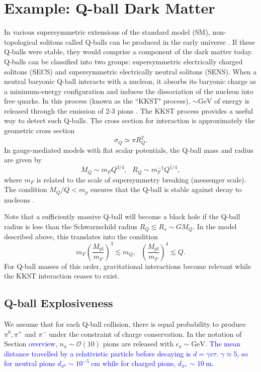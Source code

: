 \documentclass[twocolumn,showpacs,preprintnumbers,amsmath,amssymb,prd]{revtex4}
\newcommand{\OO}{\mathcal{O}}
\newcommand{\Mpl}{M_{\text{pl}}}
\def\r{\right)}
\def\l{\left(}
\begin{document}
\section{Example: Q-ball Dark Matter}
In various supersymmetric extensions of the standard model (SM), non-topological solitons called Q-balls can be produced in the early universe \cite{Coleman:1985ki, Kusenko:1997si}. If these Q-balls were stable, they would comprise a component of the dark matter today. Q-balls can be classified into two groups: supersymmetric electrically charged solitons (SECS) and supersymmetric electrically neutral solitons (SENS). When a neutral baryonic Q-ball interacts with a nucleon, it absorbs its baryonic charge as a minimum-energy configuration and induces the dissociation of the nucleon into free quarks. In this process (known as the ``KKST" process), $\sim \text{GeV}$ of energy is released through the emission of 2-3 pions \cite{Dine:2003ax}. The KKST process provides a useful way to detect such Q-balls. The cross section for interaction is approximately the geometric cross section
\begin{equation}
\sigma_Q \simeq \pi R_Q^2.
\end{equation}
In gauge-mediated models with flat scalar potentials, the Q-ball mass and radius are given by
\begin{equation}
M_Q \sim m_F Q^{3/4}, ~~~ R_Q \sim m_F^{-1} Q^{1/4},
\end{equation}
where $m_F$ is related to the scale of supersymmetry breaking (messenger scale). The condition $M_Q/Q < m_p$ ensures that the Q-ball is stable against decay to nucleons \cite{Dine:2003ax}.

Note that a sufficiently massive Q-ball will become a black hole if the Q-ball radius is less than the Schwarzschild radius $R_Q \lesssim R_s \sim G M_Q$. In the model described above, this translates into the condition
\begin{equation}
m_F \l\frac{\Mpl}{m_F}\r^3 \lesssim m_Q, ~~~ \l\frac{\Mpl}{m_F}\r^4 \lesssim Q.
\end{equation}
For Q-ball masses of this order, gravitational interactions become relevant while the KKST interaction ceases to exist.

\subsection{Q-ball Explosiveness}
We assume that for each Q-ball collision, there is equal probability to produce $\pi^0, \pi^+$ and $\pi^-$ under the constraint of charge conservation. In the notation of Section \textcolor{blue}{overview}, $n_{\pi} \sim \OO(10)$ pions are released with $\epsilon_{\pi} \sim \text{GeV}$. \textcolor{blue}{The mean distance travelled by a relativistic particle before decaying is $d = \gamma v \tau$. $\gamma \approx 5$, so for neutral pions $d_{\pi^0} \sim 10^{-5} ~\text{cm}$ while for charged pions, $d_{\pi^\pm} \sim 10 ~\text{m}$.}
\end{document}
